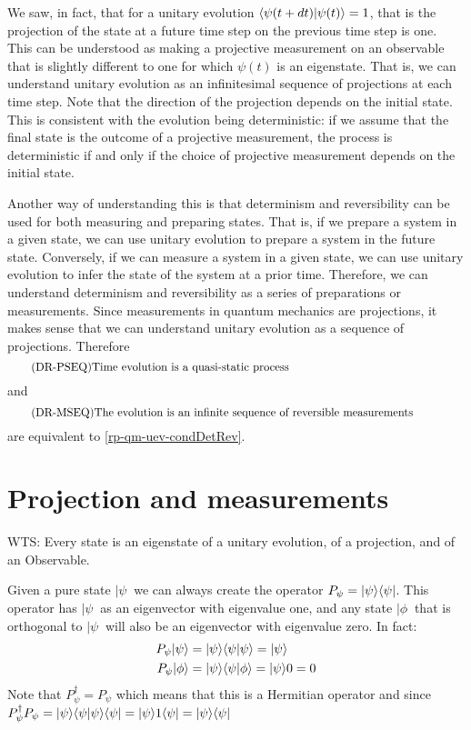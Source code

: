 We saw, in fact, that for a unitary evolution $\langle\psi(t+dt) | \psi(t)\rangle =1$, that is the projection of the state at a future time step on the previous time step is one. This can be understood as making a projective measurement on an observable that is slightly different to one for which $\psi(t)$ is an eigenstate. That is, we can understand unitary evolution as an infinitesimal sequence of projections at each time step. Note that the direction of the projection depends on the initial state. This is consistent with the evolution being deterministic: if we assume that the final state is the outcome of a projective measurement, the process is deterministic if and only if the choice of projective measurement depends on the initial state.

Another way of understanding this is that determinism and reversibility can be used for both measuring and preparing states. That is, if we prepare a system in a given state, we can use unitary evolution to prepare a system in the future state. Conversely, if we can measure a system in a given state, we can use unitary evolution to infer the state of the system at a prior time. Therefore, we can understand determinism and reversibility as a series of preparations or measurements. Since measurements in quantum mechanics are projections, it makes sense that we can understand unitary evolution as a sequence of projections. Therefore 
\begin{equation}\label{rp-qm-uev-condProjectionSequence}
	\tag{DR-PSEQ}
	\eqtext{Time evolution is a quasi-static process} 
\end{equation}
and
\begin{equation}\label{rp-qm-uev-condMeasurementSequence}
	\tag{DR-MSEQ}
	\eqtext{The evolution is an infinite sequence of reversible measurements} 
\end{equation}
are equivalent to \ref{rp-qm-uev-condDetRev}.

\section{Projection and measurements}


WTS: Every state is an eigenstate of a unitary evolution, of a projection, and of an Observable.

Given a pure state $|\psi \>$ we can always create the operator $P_{\psi}=|\psi \rangle \langle\psi|$. This operator has $|\psi\>$ as an eigenvector with eigenvalue one, and any state $|\phi\>$ that is orthogonal to $|\psi\>$ will also be an eigenvector with eigenvalue zero. In fact:
\begin{equation}
	\begin{aligned}
		P_{\psi} | \psi \rangle &= |\psi \rangle \langle\psi|\psi\rangle = |\psi \rangle \\
		P_{\psi} | \phi \rangle &= |\psi \rangle \langle\psi|\phi\rangle = |\psi \rangle 0 = 0 \\
	\end{aligned}
\end{equation}
Note that $P_{\psi}^\dagger = P_{\psi}$ which means that this is a Hermitian operator and since  $P_{\psi}^\dagger P_{\psi}  = |\psi \rangle \langle\psi|\psi\rangle \langle\psi| = |\psi \rangle 1 \langle\psi| = |\psi \rangle \langle\psi|$

